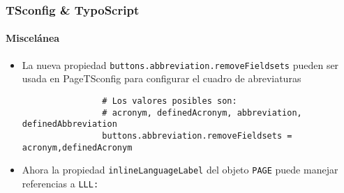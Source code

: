 \begin{frame}[fragile]
	\frametitle{TSconfig \& TypoScript}
	\framesubtitle{Miscelánea}

	\begin{itemize}
		\item La nueva propiedad \texttt{buttons.abbreviation.removeFieldsets} pueden ser
			usada en PageTSconfig para configurar el cuadro de abreviaturas

			\begin{lstlisting}
				# Los valores posibles son:
				# acronym, definedAcronym, abbreviation, definedAbbreviation
				buttons.abbreviation.removeFieldsets = acronym,definedAcronym
			\end{lstlisting}

		\item Ahora la propiedad \texttt{inlineLanguageLabel} del objeto \texttt{PAGE}
			puede manejar referencias a \texttt{LLL:}

	\end{itemize}

\end{frame}


